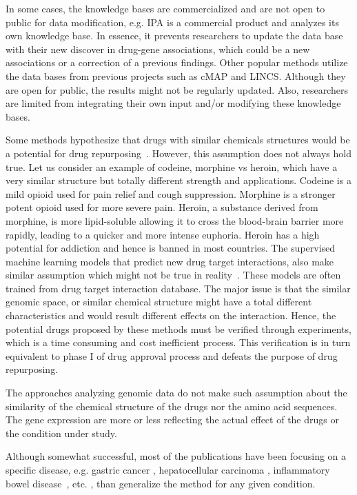 In some cases, the knowledge bases are commercialized and are not open to public for data modification, e.g. IPA is a commercial product and analyzes its own knowledge base. In essence, it prevents researchers to update the data base with their new discover in drug-gene associations, which could be a new associations or a correction of a previous findings. 
Other popular methods utilize the data bases from previous projects such as cMAP and LINCS. Although they are open for public, the results might not be regularly updated. Also, researchers are limited from integrating their own input and/or modifying these knowledge bases. 

Some methods hypothesize that drugs with similar chemicals structures would be a potential for drug repurposing~\cite{bleakley2009supervised, li2012new, tan2014drug}. However, this assumption does not always hold true. Let us consider an example of codeine, morphine vs heroin, which have a very similar structure but totally different strength and applications. Codeine is a mild opioid used for pain relief and cough suppression. Morphine is a stronger potent opioid used for more severe pain. Heroin, a substance derived from morphine, is more lipid-soluble allowing it to cross the blood-brain barrier more rapidly, leading to a quicker and more intense euphoria. Heroin has a high potential for addiction and hence is banned in most countries. 
The supervised machine learning models that predict new drug target interactions, also make similar assumption which might not be true in reality~\cite{zheng2015large, susnow2003use, shen2003development, duvenaud2015convolutional, salt1992use}. These models are often trained from drug target interaction database. The major issue is that the similar genomic space, or similar chemical structure might have a total different characteristics and would result different effects on the interaction.
Hence, the potential drugs  proposed by these methods  must be verified through experiments, which is a time consuming and cost inefficient process. This verification is in turn equivalent to phase I of drug approval process and defeats the purpose of drug repurposing.

The approaches analyzing genomic data do not make such assumption about the similarity of the chemical structure of the drugs nor the amino acid sequences. The gene expression are more or less reflecting the actual effect of the drugs or the condition under study.

Although somewhat successful, most of the publications have been focusing on a specific disease, e.g. gastric cancer \cite{claerhout2011gene}, hepatocellular carcinoma \cite{chen2011gene},  inflammatory bowel disease~\cite{dudley2011computational}, etc. , than generalize the method for any given condition.


